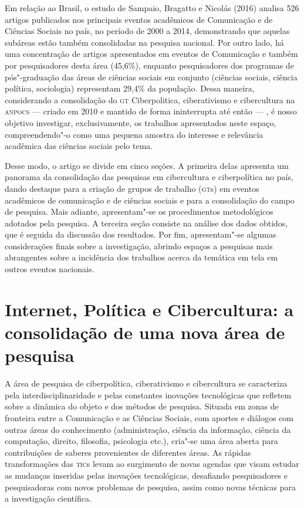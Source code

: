 Em relação ao Brasil, o estudo de Sampaio, Bragatto e Nicolás (2016)
analisa 526 artigos publicados nos principais eventos acadêmicos de
Comunicação e de Ciências Sociais no país, no período de 2000 a 2014,
demonstrando que aquelas subáreas estão também consolidadas na pesquisa
nacional. Por outro lado, há uma concentração de artigos apresentados em
eventos de Comunicação e também por pesquisadores desta área
(45,6\%), enquanto pesquisadores dos programas de pós"-graduação das
áreas de ciências sociais em conjunto (ciências sociais, ciência
política, sociologia) representam 29,4\% da população. Dessa maneira,
considerando a consolidação do \textsc{gt} Ciberpolitica, ciberativismo e
cibercultura na \textsc{anpocs} --- criado em 2010 e mantido de forma ininterrupta
até então --- , é nosso objetivo investigar, exclusivamente, os trabalhos
apresentados neste espaço, compreendendo"-o como uma pequena amostra do
interesse e relevância acadêmica das ciências sociais pelo tema.

Desse modo, o artigo se divide em cinco seções. A primeira delas
apresenta um panorama da consolidação das pesquisas em cibercultura e
ciberpolítica no país, dando destaque para a criação de grupos de
trabalho (\textsc{gt}s) em eventos acadêmicos de comunicação e de ciências
sociais e para a consolidação do campo de pesquisa. Mais adiante,
apresentam"-se os procedimentos metodológicos adotados pela pesquisa. A
terceira seção consiste na análise dos dados obtidos, que é seguida da
discussão dos resultados. Por fim, apresentam"-se algumas considerações
finais sobre a investigação, abrindo espaços a pesquisas mais
abrangentes sobre a incidência dos trabalhos acerca da temática em tela
em outros eventos nacionais.

\section{Internet, Política e Cibercultura: a consolidação de uma nova área de pesquisa}

A área de pesquisa de ciberpolítica, ciberativismo e cibercultura se
caracteriza pela interdisciplinaridade e pelas constantes inovações
tecnológicas que refletem sobre a dinâmica do objeto e dos métodos de
pesquisa. Situada em zonas de fronteira entre a Comunicação e as
Ciências Sociais, com aportes e diálogos com outras áreas do
conhecimento (administração, ciência da informação, ciência da
computação, direito, filosofia, psicologia etc.), cria"-se uma área
aberta para contribuições de saberes provenientes de diferentes áreas.
As rápidas transformações das \textsc{tic}s levam ao surgimento de novas agendas
que visam estudar as mudanças inseridas pelas inovações tecnológicas,
desafiando pesquisadores e pesquisadoras com novos problemas de
pesquisa, assim como novas técnicas para a investigação científica.


